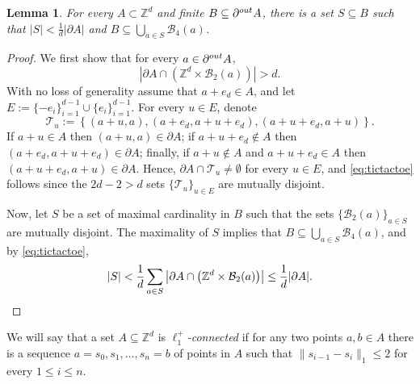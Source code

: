 \documentclass[11pt, reqno]{amsart}
\newtheorem{lemma}[theorem]{Lemma}
\numberwithin{equation}{section}
\begin{document}
\begin{lemma}\label{lem:net}
For every $A\subset {\mathbb Z}^d$ and finite $B\subseteq\partial^{\rm out}A$, there is a 
set $S\subseteq B$ such that $\lvert S\rvert<\frac{1}{d}\lvert\partial A\rvert$ and $B\subseteq\bigcup_{a\in S}{\mathcal B}_4(a)$.
\end{lemma}

\begin{proof}
We first show that for every $a\in\partial^{\rm out}A$,
\begin{equation}\label{eq:tictactoe}
\left\lvert \partial 
A\cap\left({\mathbb Z}^d\times{\mathcal B}_2(a)\right)\right\rvert>d.    
\end{equation}
With no loss of generality assume that $a+e_d\in A$, and let $E:=\{-e_i\}_{i=1}^{d-1}\cup\{e_i\}_{i=1}^{d-1}$.
For every $u\in E$, denote
$$
{\mathcal T}_u:=\left\{(a+u,a),(a+e_d,a+u+e_d), (a+u+e_d,a+u)\right\}.
$$
If $a+u\in A$ then $(a+u,a)\in\partial A$; if $a+u+e_d\notin A$ then $(a+e_d,a+u+e_d)\in\partial 
A$; finally, if $a+u\notin A$ and $a+u+e_d\in A$ then $(a+u+e_d,a+u)\in\partial A$.
Hence, $\partial A\cap{\mathcal T}_u\neq\emptyset$ for every $u\in E$, and \eqref{eq:tictactoe} follows since the $2d-2>d$ sets $\{{\mathcal T}_u\}_{u\in E}$
are mutually disjoint.

Now, let $S$ be a set of maximal cardinality in $B$ such that the sets $\{{\mathcal B}_2(a)\}_{a\in S}$ are mutually disjoint.
The maximality of $S$ implies that $B\subseteq \bigcup_{a\in S}{\mathcal B}_4(a)$, and by \eqref{eq:tictactoe}, 
\begin{equation*}
\lvert S\rvert<\frac{1}{d}\sum_{a\in S}\left\lvert\partial A\cap\left({\mathbb Z}^d\times{\mathcal B}_2(a)\right)\right\rvert\leq\frac{1}{d}\lvert\partial A\rvert.    
\qedhere\end{equation*}
\end{proof}

We will say that a set $A\subseteq{\mathbb Z}^d$ is \emph{$\ell_1^+$-connected} if for any two points $a,b\in A$ there is a sequence  $a=s_0,s_1,\ldots,s_n=b$ of points in $A$ such that $\lVert s_{i-1}-s_i\rVert_1\leq 2$ for every $1\leq i\leq n$.
\end{document}
